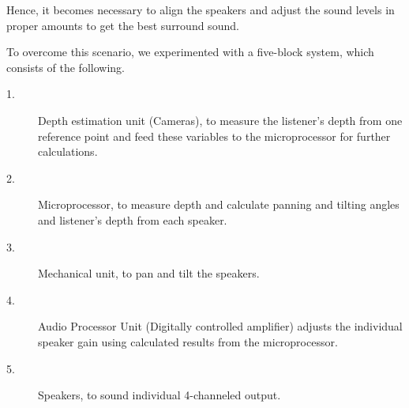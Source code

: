 \documentclass[../../../patent_v1.tex]{subfiles}
\begin{document}
Hence, it becomes necessary to align the speakers and adjust the sound levels in proper 
amounts to get the best surround sound.

To overcome this scenario, we experimented with a five-block system, which consists of the 
following.

\begin{description}
    \item[1.]Depth estimation unit (Cameras), to measure the listener's depth from one 
    reference point and feed these variables to the microprocessor for further 
    calculations.
    \item[2.]Microprocessor, to measure depth and calculate 
    panning and tilting angles and listener's depth
    from each speaker.
    \item[3.]Mechanical unit, to pan and tilt the speakers.
    \item[4.]Audio Processor Unit (Digitally controlled amplifier) adjusts the individual 
    speaker gain using calculated results from the microprocessor.
    \item[5.]Speakers, to sound individual 4-channeled output.
\end{description} 
\end{document}
